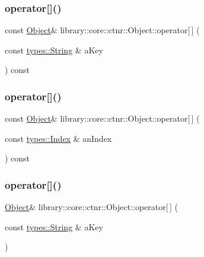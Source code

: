 \subsubsection{\texorpdfstring{operator[]()}{operator[]()}\hspace{0.1cm}{\footnotesize\ttfamily [1/4]}}
{\footnotesize\ttfamily const \hyperlink{classlibrary_1_1core_1_1ctnr_1_1_object}{Object}\& library\+::core\+::ctnr\+::\+Object\+::operator\mbox{[}$\,$\mbox{]} (\begin{DoxyParamCaption}\item[{const \hyperlink{classlibrary_1_1core_1_1types_1_1_string}{types\+::\+String} \&}]{a\+Key }\end{DoxyParamCaption}) const}

\mbox{\label{classlibrary_1_1core_1_1ctnr_1_1_object_a4f246b6d17dab0ebb1341fdb887064ad}} 
\subsubsection{\texorpdfstring{operator[]()}{operator[]()}\hspace{0.1cm}{\footnotesize\ttfamily [2/4]}}
{\footnotesize\ttfamily const \hyperlink{classlibrary_1_1core_1_1ctnr_1_1_object}{Object}\& library\+::core\+::ctnr\+::\+Object\+::operator\mbox{[}$\,$\mbox{]} (\begin{DoxyParamCaption}\item[{const \hyperlink{namespacelibrary_1_1core_1_1types_ad87eeb821d7067ec94e06ed1980d6350}{types\+::\+Index} \&}]{an\+Index }\end{DoxyParamCaption}) const}

\mbox{\label{classlibrary_1_1core_1_1ctnr_1_1_object_ab5ef00d90b9b88c0dea26f38050a1224}} 
\subsubsection{\texorpdfstring{operator[]()}{operator[]()}\hspace{0.1cm}{\footnotesize\ttfamily [3/4]}}
{\footnotesize\ttfamily \hyperlink{classlibrary_1_1core_1_1ctnr_1_1_object}{Object}\& library\+::core\+::ctnr\+::\+Object\+::operator\mbox{[}$\,$\mbox{]} (\begin{DoxyParamCaption}\item[{const \hyperlink{classlibrary_1_1core_1_1types_1_1_string}{types\+::\+String} \&}]{a\+Key }\end{DoxyParamCaption})}

